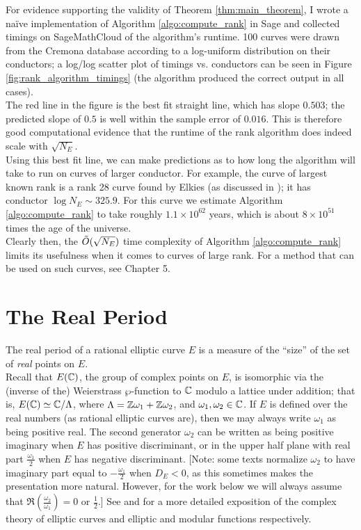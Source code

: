 For evidence supporting the validity of Theorem \ref{thm:main_theorem}, I wrote a na\"{i}ve implementation of Algorithm \ref{algo:compute_rank} in Sage and collected timings on SageMathCloud of the algorithm's runtime. 100 curves were drawn from the Cremona database according to a log-uniform distribution on their conductors; a log/log scatter plot of timings vs. conductors can be seen in Figure \ref{fig:rank_algorithm_timings} (the algorithm produced the correct output in all cases). \\

The red line in the figure is the best fit straight line, which has slope $0.503$; the predicted slope of $0.5$ is well within the sample error of $0.016$. This is therefore good computational evidence that the runtime of the rank algorithm does indeed scale with $\sqrt{N_E}$.  \\

Using this best fit line, we can make predictions as to how long the algorithm will take to run on curves of larger conductor. For example, the curve of largest known rank is a rank 28 curve found by Elkies (as discussed in \cite{Bob-2011}); it has conductor $\log N_E \sim 325.9$. For this curve we estimate Algorithm \ref{algo:compute_rank} to take roughly $1.1\times 10^{62}$ years, which is about $8\times 10^{51}$ times the age of the universe. \\

Clearly then, the $\tilde{O}(\sqrt{N_E})$ time complexity of Algorithm \ref{algo:compute_rank} limits its usefulness when it comes to curves of large rank. For a method that can be used on such curves, see Chapter 5.

\newpage
\section{The Real Period}\label{sec:real_period}

The real period of a rational elliptic curve $E$ is a measure of the ``size'' of the set of {\it real} points on $E$. \\

Recall that $E(\mathbb{C})$, the group of complex points on $E$, is isomorphic via the (inverse of the) Weierstrass $\wp$-function to $\mathbb{C}$ modulo a lattice under addition; that is, $E(\mathbb{C}) \simeq \mathbb{C}/\Lambda$, where $\Lambda = \mathbb{Z}\omega_1 + \mathbb{Z}\omega_2$, and $\omega_1,\omega_2 \in \mathbb{C}$.
If $E$ is defined over the real numbers (as rational elliptic curves are), then we may always write $\omega_1$ as being positive real. The second generator $\omega_2$ can be written as being positive imaginary when $E$ has positive discriminant, or in the upper half plane with real part $\frac{\omega_1}{2}$ when $E$ has negative discriminant. [Note: some texts normalize $\omega_2$ to have imaginary part equal to $-\frac{\omega_1}{2}$ when $D_E<0$, as this sometimes makes the presentation more natural. However, for the work below we will always assume that $\Re(\frac{\omega_2}{\omega_1}) = 0$ or $\frac{1}{2}$.] See \cite[Ch. VI]{Sil-1985} and \cite[Ch. I]{Sil-1994} for a more detailed exposition of the complex theory of elliptic curves and elliptic and modular functions respectively.

